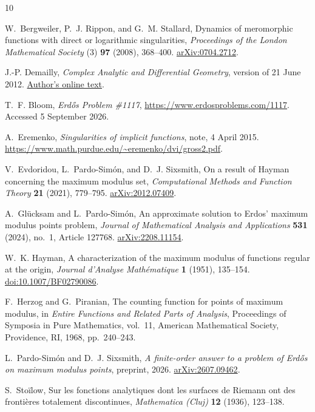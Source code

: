 \documentclass[11pt]{article}
\theoremstyle{remark}
\numberwithin{equation}{section}
\begin{document}
\begin{thebibliography}{10}

W.~Bergweiler, P.~J. Rippon, and G.~M. Stallard,
Dynamics of meromorphic functions with direct or logarithmic
singularities,
\emph{Proceedings of the London Mathematical Society} (3)
\textbf{97} (2008), 368--400.
\href{https://arxiv.org/abs/0704.2712}{arXiv:0704.2712}.

J.-P. Demailly,
\emph{Complex Analytic and Differential Geometry},
version of 21 June 2012.
\href{https://www-fourier.univ-grenoble-alpes.fr/~demailly/manuscripts/agbook.pdf}
{Author's online text}.

T.~F. Bloom,
\emph{Erd\H{o}s Problem \#1117},
\url{https://www.erdosproblems.com/1117}.
Accessed 5 September 2026.

A.~Eremenko,
\emph{Singularities of implicit functions},
note, 4 April 2015.
\url{https://www.math.purdue.edu/~eremenko/dvi/gross2.pdf}.

V.~Evdoridou, L.~Pardo-Sim\'on, and D.~J. Sixsmith,
On a result of Hayman concerning the maximum modulus set,
\emph{Computational Methods and Function Theory} \textbf{21} (2021),
779--795.
\href{https://arxiv.org/abs/2012.07409}{arXiv:2012.07409}.

A.~Gl\"ucksam and L.~Pardo-Sim\'on,
An approximate solution to Erdos' maximum modulus points problem,
\emph{Journal of Mathematical Analysis and Applications}
\textbf{531} (2024), no.~1, Article 127768.
\href{https://arxiv.org/abs/2208.11154}{arXiv:2208.11154}.

W.~K. Hayman,
A characterization of the maximum modulus of functions regular at the origin,
\emph{Journal d'Analyse Math\'ematique} \textbf{1} (1951), 135--154.
\href{https://doi.org/10.1007/BF02790086}{doi:10.1007/BF02790086}.

F.~Herzog and G.~Piranian,
The counting function for points of maximum modulus,
in \emph{Entire Functions and Related Parts of Analysis},
Proceedings of Symposia in Pure Mathematics, vol.~11,
American Mathematical Society, Providence, RI, 1968, pp.~240--243.

L.~Pardo-Sim\'on and D.~J. Sixsmith,
\emph{A finite-order answer to a problem of Erd\H{o}s on maximum
modulus points},
preprint, 2026.
\href{https://arxiv.org/abs/2607.09462}{arXiv:2607.09462}.

S.~Sto\"ilow,
Sur les fonctions analytiques dont les surfaces de Riemann ont des
fronti\`eres totalement discontinues,
\emph{Mathematica (Cluj)} \textbf{12} (1936), 123--138.

\end{thebibliography}
\end{document}

